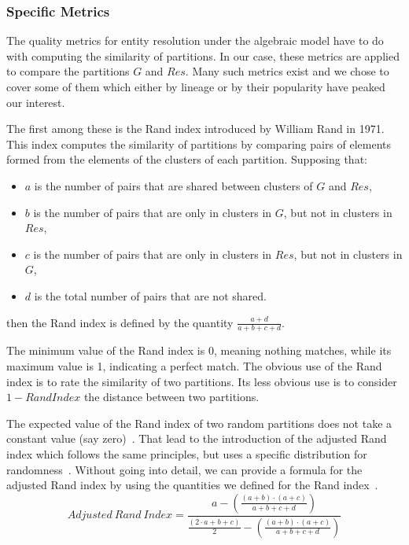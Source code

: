 \documentclass[lettersize,journal]{IEEEtran}
\begin{document}
    \subsubsection[algeval]{Specific Metrics}\label{subsubsec:algeval}

    The quality metrics for entity resolution under the algebraic model have to
    do with computing the similarity of partitions.
    In our case, these metrics are applied to compare the partitions $G$ and
    $Res$.
    Many such metrics exist\cite{hitesh2012} and we chose to cover some of them
    which either by lineage or by their popularity have peaked our interest.

    The first among these is the Rand index introduced by William Rand in
    1971\cite{rand1971}.
    This index computes the similarity of partitions by comparing pairs of
    elements formed from the elements of the clusters of each partition.
    Supposing that:
    \begin{itemize}
        \item $a$ is the number of pairs that are shared between clusters of $G$
        and $Res$,
        \item $b$ is the number of pairs that are only in clusters in $G$, but
        not in clusters in $Res$,
        \item $c$ is the number of pairs that are only in clusters in $Res$, but
        not in clusters in $G$,
        \item $d$ is the total number of pairs that are not shared.
    \end{itemize}
    then the Rand index is defined by the quantity
    $\frac{a+d}{a+b+c+d}$\cite{adjrand2001}.

    The minimum value of the Rand index is 0, meaning nothing matches, while its
    maximum value is 1, indicating a perfect match.
    The obvious use of the Rand index is to rate the similarity of two
    partitions.
    Its less obvious use is to consider $1 - Rand Index$ the distance between
    two partitions.

    The expected value of the Rand index of two random partitions does not take
    a constant value (say zero)~\cite{adjrand2001}.
    That lead to the introduction of the adjusted Rand index which follows the
    same principles, but uses a specific distribution for
    randomness~\cite{adjrand1985}.
    Without going into detail, we can provide a formula for the adjusted Rand
    index by using the quantities we defined for the Rand index~\cite{Tal11}.
    \[
        Adjusted~Rand~Index = \frac{
            a -\left(\frac{(a+b)\cdot(a+c)}{a+b+c+d}\right)
        }{
            \frac{(2\cdot a+b+c)}{2}-\left(\frac{(a+b)\cdot(a+c)}{a+b+c+d}\right)
        }
    \]
\end{document}
